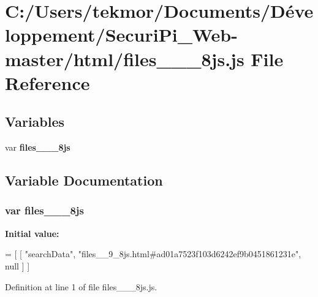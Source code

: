 \section{C\+:/\+Users/tekmor/\+Documents/\+Développement/\+Securi\+Pi\+\_\+\+Web-\/master/html/files\+\_\+\+\_\+\_\+8js.js File Reference}
\label{files____9__8js_8js}
\subsection*{Variables}
\begin{DoxyCompactItemize}
\item 
var {\bf files\+\_\+\+\_\+\_\+8js}
\end{DoxyCompactItemize}


\subsection{Variable Documentation}
\subsubsection[{files\+\_\+\+\_\+9\+\_\+8js}]{\setlength{\rightskip}{0pt plus 5cm}var files\+\_\+\+\_\+\_\+8js}\label{files____9__8js_8js_a5634a2679cd4f876371bab5aafba6819}
{\bfseries Initial value\+:}
\begin{DoxyCode}
=
[
    [ \textcolor{stringliteral}{"searchData"}, \textcolor{stringliteral}{"files\_\_9\_8js.html#ad01a7523f103d6242ef9b0451861231e"}, null ]
]
\end{DoxyCode}


Definition at line 1 of file files\+\_\+\+\_\+\_\+8js.\+js.

